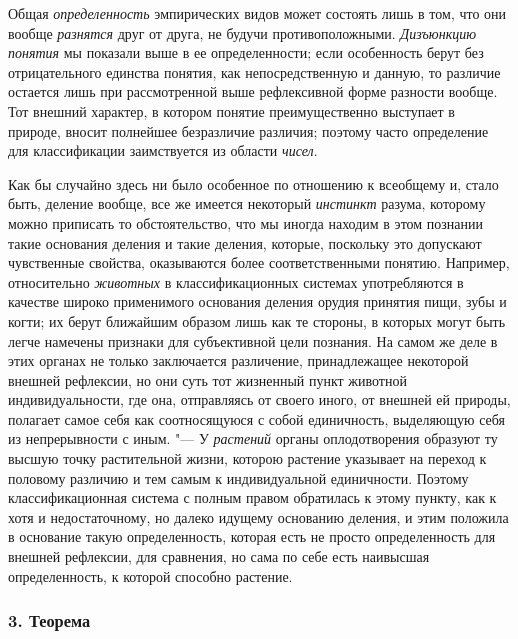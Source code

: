 {{Общая {\em определенность}
эмпирических видов может состоять лишь в том, что они вообще
{\em разнятся} друг от
друга, не будучи противоположными.
{\em Дизъюнкцию понятия}
мы показали выше в ее определенности; если особенность берут
без отрицательного единства понятия, как непосредственную и данную, то
различие остается лишь при рассмотренной выше рефлексивной форме разности
вообще. Тот внешний характер, в котором понятие преимущественно выступает в
природе, вносит полнейшее безразличие различия; поэтому часто определение
для классификации заимствуется из области
{\em чисел}.

Как бы случайно здесь ни было особенное по отношению к
всеобщему и, стало быть, деление вообще, все же имеется некоторый
{\em инстинкт} разума,
которому можно приписать то обстоятельство, что мы иногда находим в этом
познании такие основания деления и такие деления, которые, поскольку это
допускают чувственные свойства, оказываются более соответственными понятию.
Например, относительно {\em животных}
в классификационных системах употребляются в качестве широко
применимого основания деления орудия принятия пищи, зубы и когти; их берут
ближайшим образом лишь как те стороны, в которых могут быть легче намечены
признаки для субъективной цели познания. На самом же деле в этих органах не
только заключается различение, принадлежащее некоторой внешней рефлексии,
но они суть тот жизненный пункт животной индивидуальности, где она,
отправляясь от своего иного, от внешней ей природы, полагает самое себя
как соотносящуюся с собой единичность, выделяющую себя из непрерывности с
иным. "--- У {\em растений} органы
оплодотворения образуют ту высшую точку растительной жизни, которою
растение указывает на переход к половому различию и тем самым к
индивидуальной единичности. Поэтому классификационная система с полным
правом обратилась к этому пункту, как к хотя и недостаточному, но далеко
идущему основанию деления, и этим положила в основание такую
определенность, которая есть не просто определенность для внешней
рефлексии, для сравнения, но сама по себе есть наивысшая определенность, к
которой способно растение.

\subsubsection[3. Теорема]{\bfseries 3. Теорема}

}}
